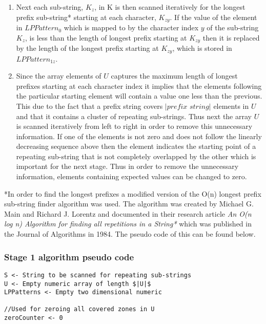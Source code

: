 \documentclass[12pt]{article}
\begin{document}
\begin{flushleft}
\begin{enumerate}
		\item Next each sub-string, $K_{z}$, in K is then scanned iteratively for the longest prefix sub-string* starting at each character, $K_{zy}$. If the value of the element in $LPPattern_{0}$ which is mapped to by the character index $y$ of the sub-string $K_{z}$, is less than the length of longest prefix starting at $K_{zy}$ then it is replaced by the length of the longest prefix starting at $K_{zy}$, which is stored in $LPPattern_{1z}$. \\
						
		\item Since the array elements of $U$ captures the maximum length of longest prefixes starting at each character index it implies that the elements following the particular starting element will contain a value one less than the previous. This due to the fact that a prefix string covers $|\textit{prefix string}|$ elements in $U$ and that it contains a cluster of repeating sub-strings. Thus next the array $U$ is scanned iteratively from left to right in order to remove this unnecessary information. If one of the elements is not zero and does not follow the linearly decreasing sequence above then the element indicates the starting point of a repeating sub-string that is not completely overlapped by the other which is important for the next stage. Thus in order to remove the unnecessary information, elements containing expected values can be changed to zero.
		
		\end{enumerate}
				  
		*In order to find the longest prefixes a modified version of the O(n) longest prefix sub-string finder algorithm was used. The algorithm was created by Michael G. Main and Richard J. Lorentz and documented in their research article \textit{An O(n log n) Algorithm for finding all repetitions in a String*} which was published in the Journal of Algorithms in 1984. The pseudo code of this can be found below.\\
		\newpage
		\subsubsection{Stage 1 algorithm pseudo code}
\begin{lstlisting}
S <- String to be scanned for repeating sub-strings
U <- Empty numeric array of length $|U|$
LPPatterns <- Empty two dimensional numeric

//Used for zeroing all covered zones in U
zeroCounter <- 0 
 


\end{lstlisting}
\end{flushleft}
\end{document}
